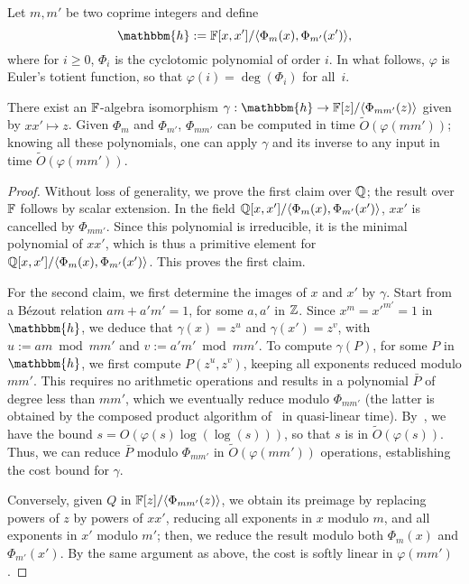 Let $m,m'$ be two coprime integers and define
$$\mathbbm{h}:=\F[x,x']/\langle \Phi_{m}(x), \Phi_{m'}(x')\rangle,$$
where for $i \ge 0$, $\Phi_i$ is the cyclotomic polynomial of order
$i$. In what follows, $\varphi$ is Euler's totient function, so that
$\varphi(i) = \deg(\Phi_i)$ for all~$i$.
\begin{lemma}
  There exist an $\mathbb{F}$-algebra isomorphism $\gamma: \mathbbm{h} \to
  \F[z]/\langle\Phi_{mm'}(z)\rangle$ given by $xx' \mapsto z$.  Given
  $\Phi_m$ and $\Phi_{m'}$, $\Phi_{mm'}$ can be computed in time
  $\tilde{O}(\varphi(mm'))$; knowing all these polynomials, one can
  apply $\gamma$ and its inverse to any input in time
  $\tilde{O}(\varphi(mm'))$.
\end{lemma}
\begin{proof}
  Without loss of generality, we prove the first claim over $\mathbb{Q}$; the
  result over $\mathbb{F}$ follows by scalar extension. In the field \sloppy
  $\mathbb{Q}[x,x']/\langle \Phi_{m}(x), \Phi_{m'}(x')\rangle$, $xx'$ is
  cancelled by $\Phi_{mm'}$. Since this polynomial is irreducible, it
  is the minimal polynomial of $xx'$, which is thus a primitive
  element for $\mathbb{Q}[x,x']/\langle \Phi_{m}(x),
  \Phi_{m'}(x')\rangle$. This proves the first claim.

  For the second claim, we first determine the images of $x$ and $x'$
  by $\gamma$. Start from a B\'ezout relation $am+ a'm'=1$, for some
  $a,a'$ in $\mathbb{Z}$.  Since $x^m = {x'}^{m'}=1$ in $\mathbbm{h}$, we
  deduce that $\gamma(x)=z^{u}$ and $\gamma(x') = z^{v}$, with $u:=am
  \bmod mm'$ and $v:=a'm' \bmod mm'$. To compute $\gamma(P)$, for some
  $P$ in $\mathbbm{h}$, we first compute $P(z^u, z^v)$, keeping all
  exponents reduced modulo $mm'$. This requires no arithmetic
  operations and results in a polynomial $\bar P$ of degree less than
  $mm'$, which we eventually reduce modulo $\Phi_{mm'}$ (the latter is
  obtained by the composed product algorithm of~\cite{BoFlSaSc06} in
  quasi-linear time).  By~\cite[Theorem~8.8.7]{BacSha96}, we have the
  bound $s = O(\varphi(s) \log(\log(s)))$, so that $s$ is in
  $\tilde{O}(\varphi(s))$. Thus, we can reduce $\bar P$ modulo
  $\Phi_{mm'}$ in $\tilde{O}(\varphi(mm'))$ operations, establishing
  the cost bound for $\gamma$.

Conversely, given $Q$ in $\mathbb{F}[z]/\langle\Phi_{mm'}(z)\rangle$, we
obtain its preimage by replacing powers of $z$ by powers of $xx'$,
reducing all exponents in $x$ modulo $m$, and all exponents in $x'$
modulo $m'$; then, we reduce the result modulo both $\Phi_m(x)$ and
$\Phi_{m'}(x')$.  By the same argument as above, the cost is softly
linear in $\varphi(mm')$.
\end{proof}

